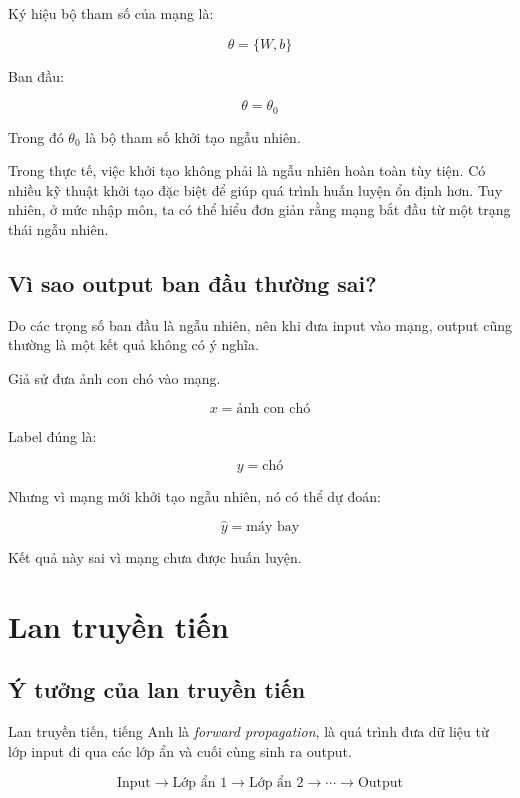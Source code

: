 \documentclass[12pt,a4paper]{report}
\begin{document}
Ký hiệu bộ tham số của mạng là:

\[
    \theta = \{W,b\}
\]

Ban đầu:

\[
    \theta = \theta_0
\]

Trong đó $\theta_0$ là bộ tham số khởi tạo ngẫu nhiên.

\begin{luuy}
Trong thực tế, việc khởi tạo không phải là ngẫu nhiên hoàn toàn tùy tiện. Có nhiều kỹ thuật khởi tạo đặc biệt để giúp quá trình huấn luyện ổn định hơn. Tuy nhiên, ở mức nhập môn, ta có thể hiểu đơn giản rằng mạng bắt đầu từ một trạng thái ngẫu nhiên.
\end{luuy}

\section{Vì sao output ban đầu thường sai?}

Do các trọng số ban đầu là ngẫu nhiên, nên khi đưa input vào mạng, output cũng thường là một kết quả không có ý nghĩa.

\begin{vidu}
Giả sử đưa ảnh con chó vào mạng.

\[
    x = \text{ảnh con chó}
\]

Label đúng là:

\[
    y = \text{chó}
\]

Nhưng vì mạng mới khởi tạo ngẫu nhiên, nó có thể dự đoán:

\[
    \hat{y} = \text{máy bay}
\]

Kết quả này sai vì mạng chưa được huấn luyện.
\end{vidu}

\chapter{Lan truyền tiến}

\section{Ý tưởng của lan truyền tiến}

Lan truyền tiến, tiếng Anh là \textit{forward propagation}, là quá trình đưa dữ liệu từ lớp input đi qua các lớp ẩn và cuối cùng sinh ra output.

\[
    \text{Input} \rightarrow \text{Lớp ẩn 1} \rightarrow \text{Lớp ẩn 2} \rightarrow \cdots \rightarrow \text{Output}
\]
\end{document}
